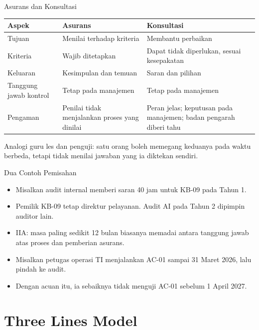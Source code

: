 \documentclass[aspectratio=169, table, 12pt]{beamer}
\begin{document}
\begin{frame}{{\Large Asurans dan Konsultasi}}
  \vspace{4pt}
  \scriptsize
  \begin{tabularx}{\textwidth}{|>{\raggedright\arraybackslash}p{}|>{\raggedright\arraybackslash}X|>{\raggedright\arraybackslash}X|}
    \hline
    \textbf{Aspek} & \textbf{Asurans} & \textbf{Konsultasi} \\ \hline
    Tujuan & Menilai terhadap kriteria & Membantu perbaikan \\ \hline
    Kriteria & Wajib ditetapkan & Dapat tidak diperlukan, sesuai kesepakatan \\ \hline
    Keluaran & Kesimpulan dan temuan & Saran dan pilihan \\ \hline
    Tanggung jawab kontrol & Tetap pada manajemen & Tetap pada manajemen \\ \hline
    Pengaman & Penilai tidak menjalankan proses yang dinilai & Peran jelas; keputusan pada
    manajemen; badan pengarah diberi tahu \\ \hline
  \end{tabularx}

  \vspace{8pt}
  \small Analogi guru les dan penguji: satu orang boleh memegang keduanya pada waktu berbeda, tetapi
  tidak menilai jawaban yang ia diktekan sendiri.
\end{frame}

\begin{frame}{{\Large Dua Contoh Pemisahan}}
  \vspace{6pt}
  \small
  \begin{itemize}
    \item Misalkan audit internal memberi saran 40 jam untuk KB-09 pada Tahun 1.
    \item Pemilik KB-09 tetap direktur pelayanan. Audit AI pada Tahun 2 dipimpin auditor lain.
    \item IIA: masa paling sedikit 12 bulan biasanya memadai antara tanggung jawab atas proses dan
          pemberian asurans.
    \item Misalkan petugas operasi TI menjalankan AC-01 sampai 31 Maret 2026, lalu pindah ke audit.
    \item Dengan acuan itu, ia sebaiknya tidak menguji AC-01 sebelum 1 April 2027.
  \end{itemize}
\end{frame}

\section{Three Lines Model}
\end{document}
